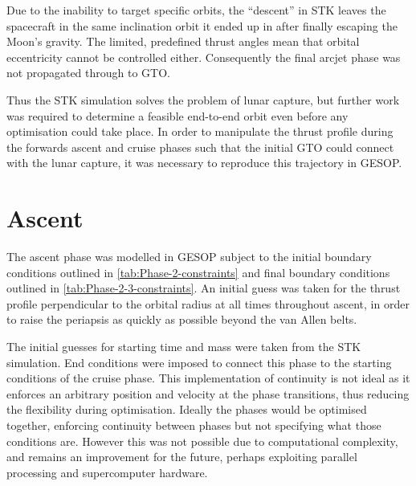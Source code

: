 Due to the inability to target specific orbits, the \enquote{descent} in STK leaves the spacecraft in the same inclination orbit it ended up in after finally escaping the Moon's gravity. The limited, predefined thrust angles mean that orbital eccentricity cannot be controlled either. Consequently the final arcjet phase was not propagated through to GTO. 

Thus the STK simulation solves the problem of lunar capture, but further work was required to determine a feasible end-to-end orbit even before any optimisation could take place. In order to manipulate the thrust profile during the forwards ascent and cruise phases such that the initial GTO could connect with the lunar capture, it was necessary to reproduce this trajectory in GESOP. 


\section{Ascent} \label{sec:Ascent}
The ascent phase was modelled in GESOP subject to the initial boundary conditions outlined in \autoref{tab:Phase-2-constraints} and final boundary conditions outlined in \autoref{tab:Phase-2-3-constraints}. An initial guess was taken for the thrust profile perpendicular to the orbital radius at all times throughout ascent, in order to raise the periapsis as quickly as possible beyond the van Allen belts.

The initial guesses for starting time and mass were taken from the STK simulation. End conditions were imposed to connect this phase to the starting conditions of the cruise phase. This implementation of continuity is not ideal as it enforces an arbitrary position and velocity at the phase transitions, thus reducing the flexibility during optimisation. Ideally the phases would be optimised together, enforcing continuity between phases but not specifying what those conditions are. However this was not possible due to computational complexity, and remains an improvement for the future, perhaps exploiting parallel processing and supercomputer hardware.

